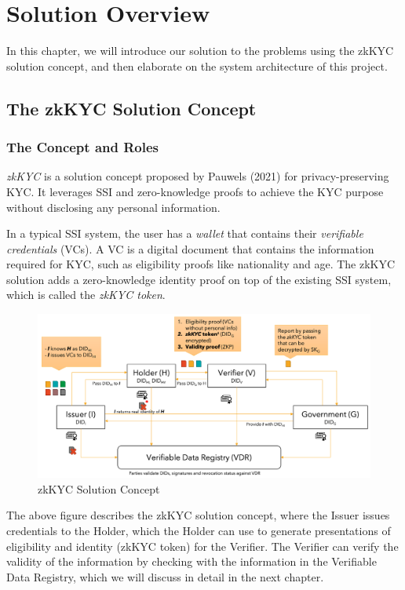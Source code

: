\documentclass[
]{report}
\begin{document}
\chapter{Solution Overview}
In this chapter, we will introduce our solution to the problems using
the zkKYC solution concept, and then elaborate on the system
architecture of this project.

\section{The zkKYC Solution Concept}

\subsection*{The Concept and Roles}
\emph{zkKYC} is a solution concept proposed by Pauwels (2021) for
privacy-preserving KYC. It leverages SSI and zero-knowledge proofs to
achieve the KYC purpose without disclosing any personal information.

In a typical SSI system, the user has a \emph{wallet} that contains
their \emph{verifiable credentials} (VCs). A VC is a digital document
that contains the information required for KYC, such as eligibility
proofs like nationality and age. The zkKYC solution
adds a zero-knowledge identity proof on top of the existing SSI
system, which is called the \emph{zkKYC token}.

\begin{figure}
\centering
\includegraphics{zkkyc-system.png}
\caption{zkKYC Solution Concept}
\end{figure}

The above figure describes the zkKYC solution concept, where the Issuer
issues credentials to the Holder, which the Holder can use to generate
presentations of eligibility and identity (zkKYC token) for the Verifier.
The Verifier can verify the validity of the information by checking with
the information in the Verifiable Data Registry, which we will discuss
in detail in the next chapter.
\end{document}
